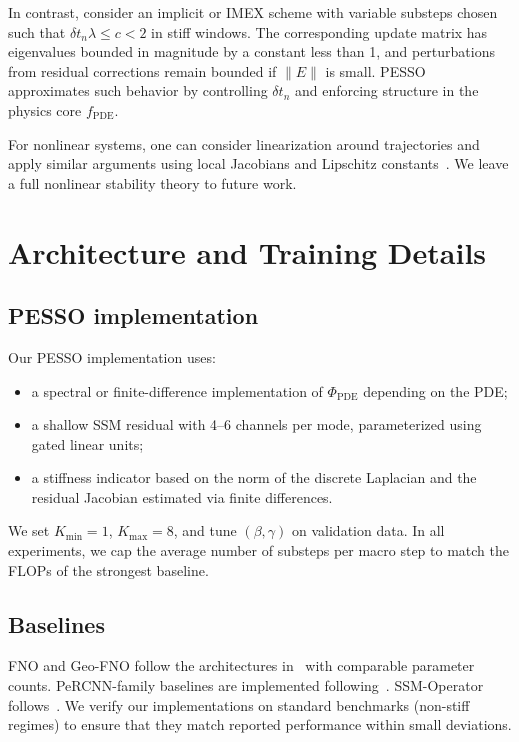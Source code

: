 \documentclass{article}
\theoremstyle{plain}
\theoremstyle{definition}
\theoremstyle{remark}
\begin{document}
In contrast, consider an implicit or IMEX scheme with variable substeps chosen such that $\delta t_n \lambda \le c < 2$ in stiff windows.
The corresponding update matrix has eigenvalues bounded in magnitude by a constant less than 1, and perturbations from residual corrections remain bounded if $\|E\|$ is small.
PESSO approximates such behavior by controlling $\delta t_n$ and enforcing structure in the physics core $f_{\text{PDE}}$.

For nonlinear systems, one can consider linearization around trajectories and apply similar arguments using local Jacobians and Lipschitz constants~\cite{yu2024dynSysIntro,oh2025ndeReview}.
We leave a full nonlinear stability theory to future work.

\section{Architecture and Training Details}
\label{app:exp-details}

\subsection{PESSO implementation}

Our PESSO implementation uses:
\begin{itemize}
  \item a spectral or finite-difference implementation of $\Phi_{\text{PDE}}$ depending on the PDE;
  \item a shallow SSM residual with 4--6 channels per mode, parameterized using gated linear units;
  \item a stiffness indicator based on the norm of the discrete Laplacian and the residual Jacobian estimated via finite differences.
\end{itemize}
We set $K_{\min}=1$, $K_{\max}=8$, and tune $(\beta,\gamma)$ on validation data.
In all experiments, we cap the average number of substeps per macro step to match the FLOPs of the strongest baseline.

\subsection{Baselines}

FNO and Geo-FNO follow the architectures in~\cite{li2020fno,li2023geoFNO} with comparable parameter counts.
PeRCNN-family baselines are implemented following~\cite{rao2021percenn,ren2022phyCRNet,cao2024phyICNet,ren2025mtsPercnn,ren2025tawPercnn,wang2025pecan,wan2025pesanet}.
SSM-Operator follows~\cite{hu2024ssmNeuralOperator}.
We verify our implementations on standard benchmarks (non-stiff regimes) to ensure that they match reported performance within small deviations.
\end{document}
